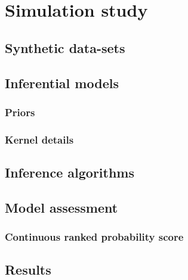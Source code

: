\documentclass[a4paper, nobind]{templates/ociamthesis}
\begin{document}
\hypertarget{simulation-study}{%
\section{Simulation study}\label{simulation-study}}

\hypertarget{synthetic-data-sets}{%
\subsection{Synthetic data-sets}\label{synthetic-data-sets}}

\hypertarget{inferential-models}{%
\subsection{Inferential models}\label{inferential-models}}

\hypertarget{priors}{%
\subsubsection{Priors}\label{priors}}

\hypertarget{kernel-details}{%
\subsubsection{Kernel details}\label{kernel-details}}

\hypertarget{inference-algorithms}{%
\subsection{Inference algorithms}\label{inference-algorithms}}

\hypertarget{model-assessment}{%
\subsection{Model assessment}\label{model-assessment}}

\hypertarget{continuous-ranked-probability-score}{%
\subsubsection{Continuous ranked probability score}\label{continuous-ranked-probability-score}}

\hypertarget{results}{%
\subsection{Results}\label{results}}
\end{document}
